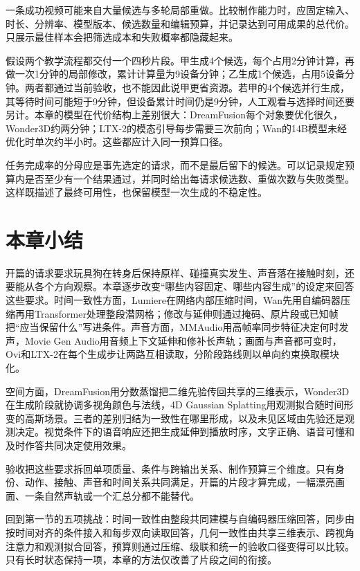 一条成功视频可能来自大量候选与多轮局部重做。比较制作能力时，应固定输入、时长、分辨率、模型版本、候选数量和编辑预算，并记录达到可用成果的总代价。只展示最佳样本会把筛选成本和失败概率都隐藏起来。

假设两个教学流程都交付一个四秒片段。甲生成4个候选，每个占用2分钟计算，再做一次1分钟的局部修改，累计计算量为9设备分钟；乙生成1个候选，占用5设备分钟。两者都通过当前验收，也不能因此说甲更省资源。若甲的4个候选并行生成，其等待时间可能短于9分钟，但设备累计时间仍是9分钟，人工观看与选择时间还要另计。本章的模型在代价结构上差别很大：DreamFusion每个对象要优化很久，Wonder3D约两分钟；LTX-2的模态引导每步需要三次前向；Wan的14B模型未经优化时单次约半小时。这些都应计入同一预算口径。

任务完成率的分母应是事先选定的请求，而不是最后留下的候选。可以记录规定预算内是否至少有一个结果通过，并同时给出每请求候选数、重做次数与失败类型。这样既描述了最终可用性，也保留模型一次生成的不稳定性。

\section{本章小结}
\label{sec:vision-multigen-summary}

开篇的请求要求玩具狗在转身后保持原样、碰撞真实发生、声音落在接触时刻，还要能从各个方向观察。本章逐步改变“哪些内容固定、哪些内容生成”的设定来回答这些要求。时间一致性方面，Lumiere在网络内部压缩时间，Wan先用自编码器压缩再用Transformer处理整段潜网格；修改与延伸则通过掩码、原片段或已知帧把“应当保留什么”写进条件。声音方面，MMAudio用高帧率同步特征决定何时发声，Movie Gen Audio用音频上下文延伸和修补长声轨；画面与声音都可变时，Ovi和LTX-2在每个生成步让两路互相读取，分阶段路线则以单向约束换取模块化。

空间方面，DreamFusion用分数蒸馏把二维先验传回共享的三维表示，Wonder3D在生成阶段就协调多视角颜色与法线，4D Gaussian Splatting用观测拟合随时间形变的高斯场景。三者的差别归结为一致性在哪里形成，以及未见区域由先验还是观测决定。视觉条件下的语音响应还把生成延伸到播放时序，文字正确、语音可懂和及时作答共同决定使用效果。

验收把这些要求拆回单项质量、条件与跨输出关系、制作预算三个维度。只有身份、动作、接触、声音和时间关系共同满足，开篇的片段才算完成，一幅漂亮画面、一条自然声轨或一个汇总分都不能替代。

回到第一节的五项挑战：时间一致性由整段共同建模与自编码器压缩回答，同步由按时间对齐的条件接入和每步双向读取回答，几何一致性由共享三维表示、跨视角注意力和观测拟合回答，预算则通过压缩、级联和统一的验收口径变得可以比较。只有长时状态保持一项，本章的方法仅改善了片段之间的衔接。

